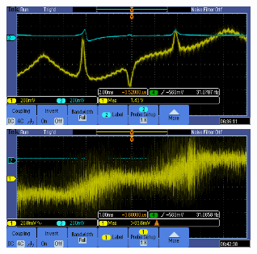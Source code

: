 \documentclass{beamer}
\begin{document}
\begin{frame}{}
  \begin{center}
    \includegraphics[width=8cm]{srs_all.png}\\
    \vspace{0.5cm}
    \includegraphics[width=8cm]{interfere_noise.png}
  \end{center}
\end{frame}
\end{document}
